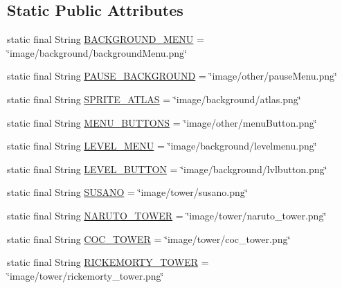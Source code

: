 \subsection*{Static Public Attributes}
\begin{DoxyCompactItemize}
\item 
static final String \hyperlink{classhelpz_1_1_load_save_aa3d77f674caa25e1212a9469f7f3f86e}{B\+A\+C\+K\+G\+R\+O\+U\+N\+D\+\_\+\+M\+E\+NU} = \char`\"{}image/background/background\+Menu.\+png\char`\"{}
\item 
static final String \hyperlink{classhelpz_1_1_load_save_ab5adc2b0154566adad84ad8836d4cc6e}{P\+A\+U\+S\+E\+\_\+\+B\+A\+C\+K\+G\+R\+O\+U\+ND} = \char`\"{}image/other/pause\+Menu.\+png\char`\"{}
\item 
static final String \hyperlink{classhelpz_1_1_load_save_afa24c28e25d1df4719d7dca0750f892c}{S\+P\+R\+I\+T\+E\+\_\+\+A\+T\+L\+AS} = \char`\"{}image/background/atlas.\+png\char`\"{}
\item 
static final String \hyperlink{classhelpz_1_1_load_save_acd53c408dd6c3509f666a212ef834653}{M\+E\+N\+U\+\_\+\+B\+U\+T\+T\+O\+NS} = \char`\"{}image/other/menu\+Button.\+png\char`\"{}
\item 
static final String \hyperlink{classhelpz_1_1_load_save_a937846c40e8ef6e76c6fd841bd30917f}{L\+E\+V\+E\+L\+\_\+\+M\+E\+NU} = \char`\"{}image/background/levelmenu.\+png\char`\"{}
\item 
static final String \hyperlink{classhelpz_1_1_load_save_ae7507d9b7c16f15ebe4497e5e2de93ef}{L\+E\+V\+E\+L\+\_\+\+B\+U\+T\+T\+ON} = \char`\"{}image/background/lvlbutton.\+png\char`\"{}
\item 
static final String \hyperlink{classhelpz_1_1_load_save_a573e1313d8174920e8909a9e889b9de6}{S\+U\+S\+A\+NO} = \char`\"{}image/tower/susano.\+png\char`\"{}
\item 
static final String \hyperlink{classhelpz_1_1_load_save_a9f26b492096e42d543a01d7416198c47}{N\+A\+R\+U\+T\+O\+\_\+\+T\+O\+W\+ER} = \char`\"{}image/tower/naruto\+\_\+tower.\+png\char`\"{}
\item 
static final String \hyperlink{classhelpz_1_1_load_save_aefbfb5d6bd8edb73a0176e67847f1ae5}{C\+O\+C\+\_\+\+T\+O\+W\+ER} = \char`\"{}image/tower/coc\+\_\+tower.\+png\char`\"{}
\item 
static final String \hyperlink{classhelpz_1_1_load_save_a23d3bf71586e29cdda21c494bba6eb2e}{R\+I\+C\+K\+E\+M\+O\+R\+T\+Y\+\_\+\+T\+O\+W\+ER} = \char`\"{}image/tower/rickemorty\+\_\+tower.\+png\char`\"{}
\item 

\end{DoxyCompactItemize}
